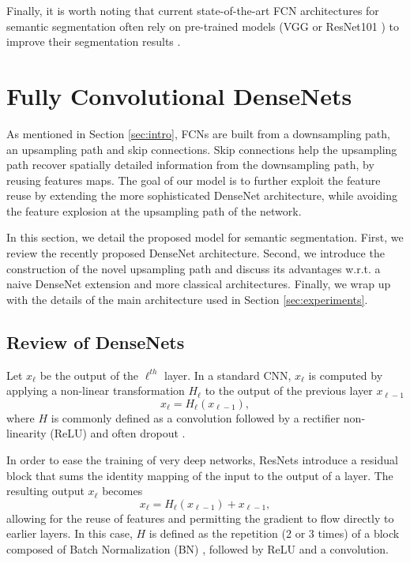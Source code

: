 \documentclass[10pt,twocolumn,letterpaper]{article}
\begin{document}
Finally, it is worth noting that current state-of-the-art FCN architectures for semantic segmentation often rely on pre-trained models (\eg VGG \cite{SimonyanZ14a} or ResNet101 \cite{HeZRS15}) to improve their segmentation results \cite{long2015fully, SegNet2015, ChenPK0Y16}.


\section{Fully Convolutional DenseNets}
\label{sec:dense_nets}
As mentioned in Section \ref{sec:intro}, FCNs are built from a downsampling path, an upsampling path and skip connections. Skip connections help the upsampling path recover spatially detailed information from the downsampling path, by reusing features maps. The goal of our model is to further exploit the feature reuse by extending the more sophisticated DenseNet architecture, while avoiding the feature explosion at the upsampling path of the network.

In this section, we detail the proposed model for semantic segmentation. First, we review the recently proposed DenseNet architecture. Second, we introduce the construction of the novel upsampling path and discuss its advantages w.r.t. a naive DenseNet extension and more classical architectures. Finally, we wrap up with the details of the main architecture used in Section \ref{sec:experiments}.

\subsection{Review of DenseNets}
\label{ssec:densenetreview}

Let $x_\ell$ be the output of the $\ell^{th}$ layer. In a standard CNN, $x_\ell$ is computed by applying a non-linear transformation $H_\ell$ to the output of the previous layer $x_{\ell-1}$
\begin{equation}
x_\ell = H_\ell(x_{\ell-1}),
\end{equation}
where $H$ is commonly defined as a convolution followed by a rectifier non-linearity (ReLU) and often dropout  \cite{srivastava14a}.

In order to ease the training of very deep networks, ResNets \cite{HeZRS15} introduce a residual block that sums the identity mapping of the input to the output of a layer. The resulting output $x_{\ell}$ becomes
\begin{equation}
x_\ell = H_\ell(x_{\ell-1}) + x_{\ell-1}, 
\end{equation}
allowing for the reuse of features and permitting the gradient to flow directly to earlier layers. In this case, $H$ is defined as the repetition (2 or 3 times) of a block composed of Batch Normalization (BN) \cite{IoffeS15}, followed by ReLU and a convolution. 
\end{document}
